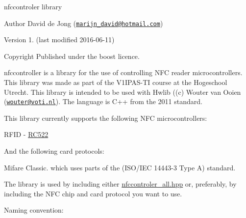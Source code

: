 nfccontroler library

\begin{DoxyAuthor}{Author}
David de Jong (\href{mailto:marijn_david@hotmail.com}{\tt marijn\+\_\+david@hotmail.\+com}) 
\end{DoxyAuthor}
\begin{DoxyVersion}{Version}
1. (last modified 2016-\/06-\/11) 
\end{DoxyVersion}
\begin{DoxyCopyright}{Copyright}
Published under the boost licence.
\end{DoxyCopyright}
nfccontroller is a library for the use of controlling N\+FC reader microcontrollers. This library was made as part of the V1\+I\+P\+A\+S-\/\+TI course at the Hogeschool Utrecht. This library is intended to be used with Hwlib ((c) Wouter van Ooien (\href{mailto:wouter@voti.nl}{\tt wouter@voti.\+nl}). The language is C++ from the 2011 standard.

This library currently supports the following N\+FC microcontrollers\+:
\begin{DoxyItemize}
\item R\+F\+ID -\/ \hyperlink{class_r_c522}{R\+C522}
\end{DoxyItemize}

And the following card protocols\+:
\begin{DoxyItemize}
\item Mifare Classic. which uses parts of the (I\+S\+O/\+I\+EC 14443-\/3 Type A) standard.
\end{DoxyItemize}

The library is used by including either \hyperlink{nfccontroler__all_8hpp_source}{nfccontroler\+\_\+all.\+hpp} or, preferably, by including the N\+FC chip and card protocol you want to use.

Naming convention\+:



